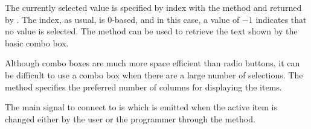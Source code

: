 The currently selected value is specified by index with the method
 and returned by
. The index, as usual, is $0$-based,
and in this case, a value of $-1$ indicates that no value is selected.
The  method can be used to retrieve
the text shown by the basic combo box.

Although combo boxes are much more space efficient than radio buttons,
it can be difficult to use a combo box when there are a large number
of selections. The  method specifies
the preferred number of columns for displaying the items.


The main signal to connect to is  which is emitted
when the active item is changed either by the user or the programmer
through the  method.

